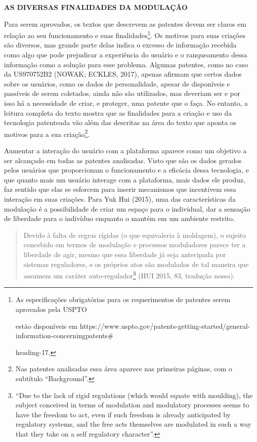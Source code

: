 \textbf{AS DIVERSAS FINALIDADES DA MODULAÇÃO}

Para serem aprovados, os textos que descrevem as patentes devem ser
claros em relação ao seu funcionamento e suas finalidades\footnote{As
  especificações obrigatórias para os requerimentos de patentes serem
  aprovados pela USPTO

  estão disponíveis em
  https://www.uspto.gov/patents-getting-started/general-information-concerningpatents\#

  heading-17.}. Os motivos para suas criações são diversos, mas grande
parte delas indica o excesso de informação recebida como algo que pode
prejudicar a experiência do usuário e o ranqueamento dessa informação
como a solução para esse problema. Algumas patentes, como no caso da
US970752B2 (NOWAK; ECKLES, 2017), apenas afirmam que certos dados sobre
os usuários, como os dados de personalidade, apesar de disponíveis e
passíveis de serem coletados, ainda não são utilizados, mas deveriam ser
e por isso há a necessidade de criar, e proteger, uma patente que o
faça. No entanto, a leitura completa do texto mostra que as finalidades
para a criação e uso da tecnologia patenteada vão além das descritas na
área do texto que aponta os motivos para a sua criação\footnote{Nas
  patentes analisadas essa área aparece nas primeiras páginas, com o
  subtítulo ``Background''.}.

Aumentar a interação do usuário com a plataforma aparece como um
objetivo a ser alcançado em todas as patentes analisadas. Visto que são
os dados gerados pelos usuários que proporcionam o funcionamento e a
eficácia dessa tecnologia, e que quanto mais um usuário interage com a
plataforma, mais dados ele produz, faz sentido que elas se esforcem para
inserir mecanismos que incentivem essa interação em suas criações. Para
Yuk Hui (2015), uma das características da modulação é a possibilidade
de criar um espaço para o individual, dar a sensação de liberdade para o
indivíduo enquanto o mantém em um ambiente restrito.

\begin{quote}
Devido à falta de regras rígidas (o que equivaleria à moldagem), o
sujeito concebido em termos de modulação e processos moduladores parece
ter a liberdade de agir, mesmo que essa liberdade já seja antecipada por
sistemas reguladores, e os próprios atos são modulados de tal maneira
que assumem um caráter auto-regulador\footnote{``Due to the lack of
  rigid regulations (which would equate with moulding), the subject
  conceived in terms of modulation and modulatory processes seems to
  have the freedom to act, even if such freedom is already anticipated
  by regulatory systems, and the free acts themselves are modulated in
  such a way that they take on a self regulatory character''.} (HUI
2015, 83, tradução nossa).
\end{quote}

